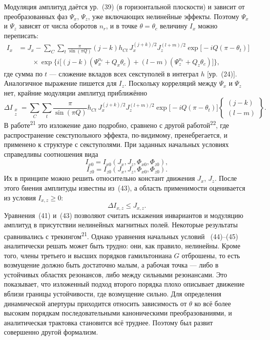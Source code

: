 \documentclass[11pt,a4paper]{article}
\begin{document}
Модуляция амплитуд даётся ур.~(39) (в горизонтальной плоскости) и зависит от
преобразованных фаз $\Psi_x$, $\Psi_z$, уже включающих нелинейные эффекты.
Поэтому $\Psi_x$ и $\Psi_z$ зависят от числа оборотов $n_r$, и в точке
$\theta=\theta_c$ величину $I_x$ можно переписать:
\begin{align}
I_x&=J_x-\sum_C\sum_t\frac{\pi}{\sin(\pi Q)}(j-k)h_{Ct}\,
J_x^{(j+k)/2}J_z^{(l+m)/2}\exp\bigl[-iQ(\pi-\theta_t)\bigr]\nonumber\\
&\qquad\times\exp\bigl\{i\bigl[(j-k)(\Psi_x^{n_r}+Q_x\theta_c)
+(l-m)(\Psi_z^{n_r}+Q_z\theta_c)\bigr]\bigr\},
\end{align}
где сумма по $t$ --- сложение вкладов всех секступолей в интеграл $h$ [ур.~(24)].
Аналогичное выражение пишется для $I_z$. Поскольку корреляций между $\Psi_x$ и
$\Psi_z$ нет, крайние модуляции амплитуд приближённо
\begin{equation}
\Delta I_{\substack{x\\z}}
=\sum_C\sum_t\frac{\pi}{\sin(\pi Q)}h_{Ct}\,
J_x^{(j+k)/2}J_z^{(l+m)/2}
\exp\bigl[-iQ(\pi-\theta_t)\bigr]
\begin{Bmatrix}(j-k)\\(l-m)\end{Bmatrix}.
\end{equation}
В работе\textsuperscript{21} это изложение дано подробно, сравнено с другой
работой\textsuperscript{22}, где распространение секступольного эффекта,
по-видимому, пренебрегается, и применено к структуре с секступолями. При заданных
начальных условиях справедливы соотношения вида
\begin{equation}
I_{x0}=I_{x0}(J_x,J_z,\Phi_{x0},\Phi_{z0}),
\end{equation}
\begin{equation}
I_{z0}=I_{z0}(J_x,J_z,\Phi_{x0},\Phi_{z0}).
\end{equation}
Их в принципе можно решить относительно констант движения $J_x$, $J_z$. После
этого биения амплитуды известны из~(43), а область применимости оценивается из
условия $I_{x,z}\ge 0$:
\begin{equation}
\Delta I_{x,z}\le J_{x,z}.
\end{equation}
Уравнения~(41) и~(43) позволяют считать искажения инвариантов и модуляцию
амплитуд в присутствии нелинейных магнитных полей. Некоторые результаты
сравнивались с трекингом\textsuperscript{21}. Однако уравнения начальных условий
~(44)--(45) аналитически решать может быть трудно: они, как правило, нелинейны.
Кроме того, члены третьего и высших порядков гамильтониана $G$ отброшены, то
есть возмущение должно быть достаточно малым, а рабочая точка --- либо в
устойчивых областях резонансов, либо между сильными резонансами. Это показывает,
что изложенный подход второго порядка плохо описывает движение вблизи границы
устойчивости, где возмущение сильно. Для определения динамической апертуры
приходится относить зависимость от $\theta$ ко всё более высоким порядкам
последовательными каноническими преобразованиями, и аналитическая трактовка
становится всё труднее. Поэтому был развит совершенно другой формализм.
\end{document}
